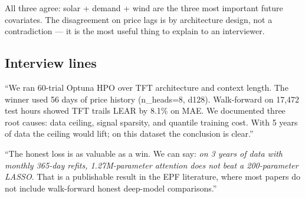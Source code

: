All three agree: solar + demand + wind are the three most important
future covariates. The disagreement on price lags is by architecture design,
not a contradiction --- it is the most useful thing to explain to an interviewer.

\subsection{Interview lines}

``We ran 60-trial Optuna HPO over TFT architecture and context length.
The winner used 56 days of price history (n\_heads=8, d128).
Walk-forward on 17,472 test hours showed TFT trails LEAR by 8.1\% on MAE.
We documented three root causes: data ceiling, signal sparsity, and quantile
training cost. With 5 years of data the ceiling would lift; on this dataset
the conclusion is clear.''

``The honest loss is as valuable as a win. We can say: \emph{on 3 years of
data with monthly 365-day refits, 1.27M-parameter attention does not beat
a 200-parameter LASSO}. That is a publishable result in the EPF literature,
where most papers do not include walk-forward honest deep-model comparisons.''

